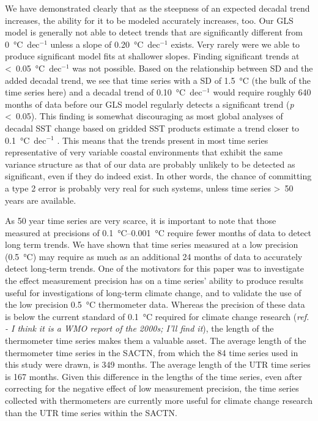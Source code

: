 \documentclass[]{ametsoc}
\begin{document}
We have demonstrated clearly that as the steepness of an expected decadal trend increases, the ability for it to be modeled accurately increases, too. Our GLS model is generally not able to detect trends that are significantly different from \SI{0}{\degreeCelsius}~dec$^{-1}$ unless a slope of \SI{0.20}{\degreeCelsius}~dec$^{-1}$ exists. Very rarely were we able to produce significant model fits at shallower slopes. Finding significant trends at \textless~\SI{0.05}{\degreeCelsius}~dec$^{-1}$ was not possible. Based on the relationship between SD and the added decadal trend, we see that time series with a SD of \SI{1.5}{\degreeCelsius} (the bulk of the time series here) and a decadal trend of \SI{0.10}{\degreeCelsius}~dec$^{-1}$ would require roughly 640 months of data before our GLS model regularly detects a significant trend (\emph{p} \textless~0.05). This finding is somewhat discouraging as most global analyses of decadal SST change based on gridded SST products estimate a trend closer to \SI{0.1}{\degreeCelsius}~dec$^{-1}$ \citep[\emph{e.g.}][]{IPCC2013}. This means that the trends present in most time series representative of very variable coastal environments that exhibit the same variance structure as that of our data are probably unlikely to be detected as significant, even if they do indeed exist. In other words, the chance of committing a type 2 error is probably very real for such systems, unless time series \textgreater~50 years are available.

As 50 year time series are very scarce, it is important to note that those measured at precisions of \SIrange{0.1}{0.001}{\degreeCelsius} require fewer months of data to detect long term trends. We have shown that time series measured at a low precision (\SI{0.5}{\degreeCelsius}) may require as much as an additional 24 months of data to accurately detect long-term trends. One of the motivators for this paper was to investigate the effect measurement precision has on a time series' ability to produce results useful for investigations of long-term climate change, and to validate the use of the low precision \SI{0.5}{\degreeCelsius} thermometer data. Whereas the precision of these data is below the current standard of \SI{0.1}{\degreeCelsius} required for climate change research (\emph{ref. - I think it is a WMO report of the 2000s; I'll find it}), the length of the thermometer time series makes them a valuable asset. The average length of the thermometer time series in the SACTN, from which the 84 time series used in this study were drawn, is 349 months. The average length of the UTR time series is 167 months. Given this difference in the lengths of the time series, even after correcting for the negative effect of low measurement precision, the time series collected with thermometers are currently more useful for climate change research than the UTR time series within the SACTN.
\end{document}
